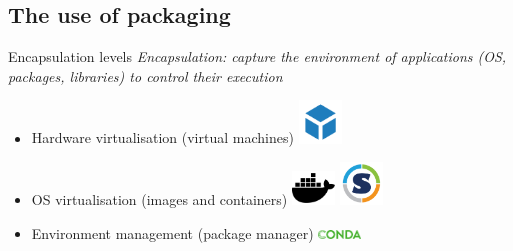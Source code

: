 \subsection{The use of packaging}
\begin{frame}[<+->]{Encapsulation levels}
\textit{Encapsulation: capture the environment of applications (OS, packages, libraries) to control their execution}
\begin{itemize}[<+->]
	\item Hardware virtualisation (virtual machines) \includegraphics[width=0.09\textwidth]{images/VM_logo.png} 
	\item OS virtualisation (images and containers) \includegraphics[width=0.09\textwidth]{images/docker.pdf} \includegraphics[width=0.09\textwidth]{images/singularity_logo.pdf} 
	\item Environment management (package manager) \includegraphics[width=0.09\textwidth]{images/conda_logo.pdf} 
\end{itemize}
\end{frame}

